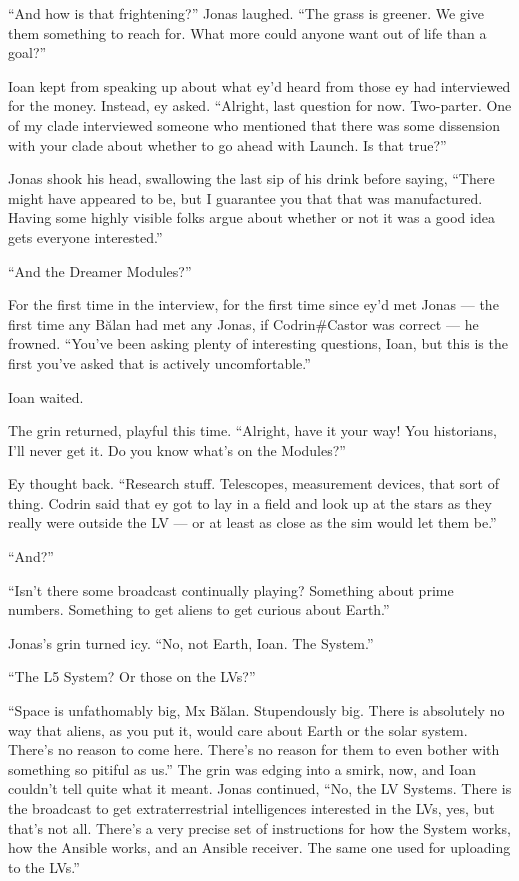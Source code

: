 ``And how is that frightening?'' Jonas laughed. ``The grass is greener. We give them something to reach for. What more could anyone want out of life than a goal?''

Ioan kept from speaking up about what ey'd heard from those ey had interviewed for the money. Instead, ey asked. ``Alright, last question for now. Two-parter. One of my clade interviewed someone who mentioned that there was some dissension with your clade about whether to go ahead with Launch. Is that true?''

Jonas shook his head, swallowing the last sip of his drink before saying, ``There might have appeared to be, but I guarantee you that that was manufactured. Having some highly visible folks argue about whether or not it was a good idea gets everyone interested.''

``And the Dreamer Modules?''

For the first time in the interview, for the first time since ey'd met Jonas — the first time any Bălan had met any Jonas, if Codrin\#Castor was correct — he frowned. ``You've been asking plenty of interesting questions, Ioan, but this is the first you've asked that is actively uncomfortable.''

Ioan waited.

The grin returned, playful this time. ``Alright, have it your way! You historians, I'll never get it. Do you know what's on the Modules?''

Ey thought back. ``Research stuff. Telescopes, measurement devices, that sort of thing. Codrin said that ey got to lay in a field and look up at the stars as they really were outside the LV — or at least as close as the sim would let them be.''

``And?''

``Isn't there some broadcast continually playing? Something about prime numbers. Something to get aliens to get curious about Earth.''

Jonas's grin turned icy. ``No, not Earth, Ioan. The System.''

``The L5 System? Or those on the LVs?''

``Space is unfathomably big, Mx Bălan. Stupendously big. There is absolutely no way that aliens, as you put it, would care about Earth or the solar system. There's no reason to come here. There's no reason for them to even bother with something so pitiful as us.'' The grin was edging into a smirk, now, and Ioan couldn't tell quite what it meant. Jonas continued, ``No, the LV Systems. There is the broadcast to get extraterrestrial intelligences interested in the LVs, yes, but that's not all. There's a very precise set of instructions for how the System works, how the Ansible works, and an Ansible receiver. The same one used for uploading to the LVs.''

